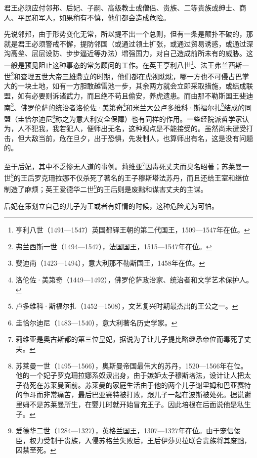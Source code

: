 \par 君王必须应付邻邦、后妃、子嗣、高级教士或僧侣、贵族、二等贵族或绅士、商人、平民和军人，如果稍有不慎，他们都会造成危险。
\par 先说邻邦，由于形势变化无常，所以提不出一个总则，但有一条是颠扑不破的，那就是君王必须警戒不懈，提防邻国（或通过领土扩张，或通过贸易诱惑，或通过深沟高垒、层层设防、步步逼近等办法）增强国力，对自己造成前所未有的威胁。这一般是预见阻止这种事态的常务顾问的工作。在英王亨利八世\footnote{亨利八世（1491—1547）英国都铎王朝的第二代国王，1509—1547年在位。}、法王弗兰西斯一世\footnote{弗兰西斯一世（1494—1547），法国国王，1515—1547年在位。}和查理五世大帝三雄鼎立的时期，他们都在虎视眈眈，哪一方也不可侵占巴掌大的一块土地，如有一方胆敢越雷池一步，其余两方就会立即采取措施，或结成联盟，如有必要则诉诸武力，而且绝不苟且偷安，养虎遗患。而由那不勒斯国王斐迪南\footnote{斐迪南（1423—1494），意大利那不勒斯国王，1458年在位。}、佛罗伦萨的统治者洛伦佐·美第奇\footnote{洛伦佐·美第奇（1449—1492），佛罗伦萨政治家、统治者和文学艺术保护人。}和米兰大公卢多维科·斯福尔扎\footnote{卢多维科·斯福尔扎（1452—1508），文艺复兴时期最杰出的王公之一。}结成的同盟（圭恰尔迪尼\footnote{圭恰尔迪尼（1483—1540），意大利著名历史学家。}称之为意大利安全保障）也有同样的作用。一些经院派哲学家认为，人不犯我，我若犯人，便师出无名，这种观点是不能接受的。虽然尚未遭受打击，但大敌当前，危在旦夕，出于恐惧，先发制人，也算师出有名，这是没有问题的。
\par 至于后妃，其中不乏惨无人道的事例。莉维亚\footnote{莉维亚是奥古斯都的第三位皇妃，据说为了让儿子提比略继承帝位而毒死了丈夫。}因毒死丈夫而臭名昭著；苏莱曼一世\footnote{苏莱曼一世（1495—1566），奥斯曼帝国最伟大的苏丹，1520—1566年在位。他的一个妃子罗克珊拉娜系奴隶出身，由于嫉妒太子穆斯塔法，设计让人把太子勒死在苏莱曼面前。苏莱曼的家庭生活由于他的两个儿子谢里姆和巴亚赛特的争斗而非常痛苦，最后巴亚赛特被打败，跟儿子一起在波斯被处死。据说谢里姆不是苏莱曼所生，在婴儿时就开始冒充王子。因此培根在后面说他是私生子。}的王后罗克珊拉娜不仅杀死了著名的王子穆斯塔法苏丹，而且还给王室和继位制造了麻烦；英王爱德华二世\footnote{爱德华二世（1284—1327），英格兰国王，1307—1327年在位。由于宠信佞臣，权力受制于贵族，入侵苏格兰失败后，王后伊莎贝拉联合贵族将其废黜，囚禁至死。}的王后则是废黜和谋害丈夫的主谋。
\par 后妃在策划立自己的儿子为王或者有奸情的时候，这种危险尤为可怕。
